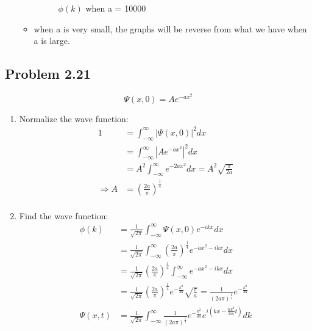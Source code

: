 \documentclass{article}
\begin{document}
\begin{enumerate}[label=(\alph*)]
\begin{itemize}
\begin{figure}[H]
			            \caption{\(\phi(k)\) when a = 10000}
		            \end{figure}
		      \item when a is very small, the graphs will be reverse from what we have when a is large.
	      \end{itemize}
\end{enumerate}

\subsection*{Problem 2.21}
\[\Psi(x,0) = A e^{-ax^2}\]
\begin{enumerate}[label=(\alph*)]
	\item Normalize the wave function:
	      \begin{align*}
		      1             & = \int_{-\infty}^{\infty} |\Psi(x,0)|^2 dx                               \\
		                    & = \int_{-\infty}^{\infty} |A e^{-ax^2}|^2 dx                             \\
		                    & = A^2 \int_{-\infty}^{\infty} e^{-2ax^2} dx  = A^2 \sqrt{\frac{\pi}{2a}} \\
		      \Rightarrow A & = \left(\frac{2a}{\pi}\right)^{\frac{1}{4}}                              \\
	      \end{align*}
	\item Find the wave function:
	      \begin{align*}
		      \phi(k)   & = \frac{1}{\sqrt{2 \pi}} \int_{-\infty}^{\infty} \Psi(x,0) e^{-ikx} dx                                                                                                      \\
		                & = \frac{1}{\sqrt{2 \pi}} \int_{-\infty}^{\infty} \left(\frac{2a}{\pi}\right)^{\frac{1}{4}} e^{-ax^2 -ikx}  dx                                                               \\
		                & = \frac{1}{\sqrt{2 \pi}} \left(\frac{2a}{\pi}\right)^\frac{1}{4} \int_{-\infty}^{\infty} e^{-ax^2 -ikx}  dx                                                                 \\
		                & = \frac{1}{\sqrt{2 \pi}} \left(\frac{2a}{\pi}\right)^\frac{1}{4} e^{-\frac{k^2}{4a}} \sqrt{\frac{\pi}{a}} = \frac{1}{(2a\pi)^\frac{1}{4}} e^{-\frac{k^2}{4a}}               \\
		      \Psi(x,t) & = \frac{1}{\sqrt{2\pi}} \int_{-\infty}^{\infty} \frac{1}{(2a\pi)^\frac{1}{4}} e^{-\frac{k^2}{4a}} e^{i(kx - \frac{\hbar k^2}{2m}t)} dk                                      \\

\end{align*}
\end{enumerate}
\end{document}
